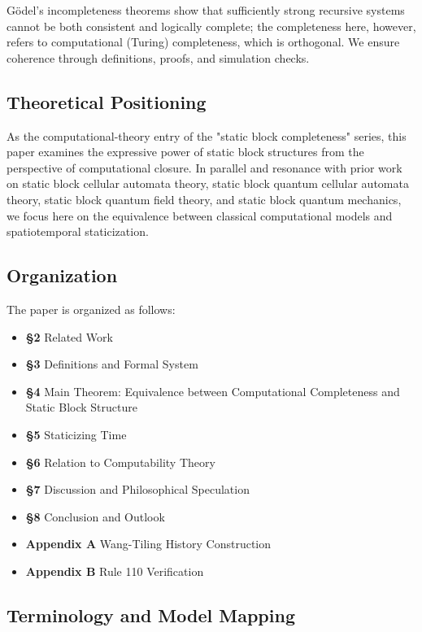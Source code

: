 \documentclass[12pt]{article}
\theoremstyle{plain}
\theoremstyle{definition}
\begin{document}
G\"{o}del's incompleteness theorems\cite{godel1931} show that sufficiently strong recursive systems cannot be both consistent and logically complete; the completeness here, however, refers to computational (Turing) completeness, which is orthogonal. We ensure coherence through definitions, proofs, and simulation checks.

\subsection{Theoretical Positioning}

As the computational-theory entry of the "static block completeness" series, this paper examines the expressive power of static block structures from the perspective of computational closure. In parallel and resonance with prior work on static block cellular automata theory, static block quantum cellular automata theory, static block quantum field theory, and static block quantum mechanics, we focus here on the equivalence between classical computational models and spatiotemporal staticization.

\subsection{Organization}

The paper is organized as follows:

\begin{itemize}
\item \textbf{\S 2} Related Work
\item \textbf{\S 3} Definitions and Formal System
\item \textbf{\S 4} Main Theorem: Equivalence between Computational Completeness and Static Block Structure
\item \textbf{\S 5} Staticizing Time
\item \textbf{\S 6} Relation to Computability Theory
\item \textbf{\S 7} Discussion and Philosophical Speculation
\item \textbf{\S 8} Conclusion and Outlook
\item \textbf{Appendix A} Wang-Tiling History Construction
\item \textbf{Appendix B} Rule 110 Verification
\end{itemize}

\subsection{Terminology and Model Mapping}
\end{document}
